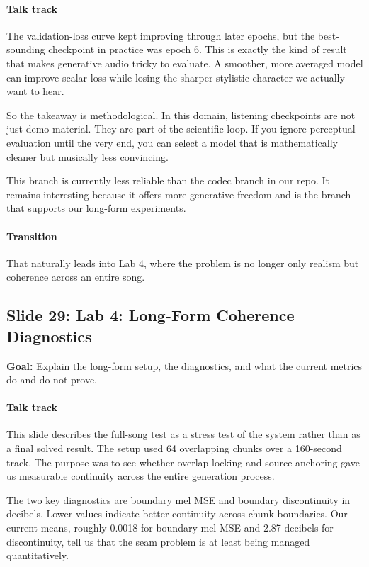 \documentclass[11pt]{article}
\begin{document}
\paragraph{Talk track}
The validation-loss curve kept improving through later epochs, but the best-sounding checkpoint in practice was epoch 6. This is exactly the kind of result that makes generative audio tricky to evaluate. A smoother, more averaged model can improve scalar loss while losing the sharper stylistic character we actually want to hear.

So the takeaway is methodological. In this domain, listening checkpoints are not just demo material. They are part of the scientific loop. If you ignore perceptual evaluation until the very end, you can select a model that is mathematically cleaner but musically less convincing.

This branch is currently less reliable than the codec branch in our repo. It remains interesting because it offers more generative freedom and is the branch that supports our long-form experiments.

\paragraph{Transition}
That naturally leads into Lab 4, where the problem is no longer only realism but coherence across an entire song.

\subsection*{Slide 29: Lab 4: Long-Form Coherence Diagnostics}
\textbf{Goal:} Explain the long-form setup, the diagnostics, and what the current metrics do and do not prove.
\paragraph{Talk track}
This slide describes the full-song test as a stress test of the system rather than as a final solved result. The setup used 64 overlapping chunks over a 160-second track. The purpose was to see whether overlap locking and source anchoring gave us measurable continuity across the entire generation process.

The two key diagnostics are boundary mel MSE and boundary discontinuity in decibels. Lower values indicate better continuity across chunk boundaries. Our current means, roughly 0.0018 for boundary mel MSE and 2.87 decibels for discontinuity, tell us that the seam problem is at least being managed quantitatively.
\end{document}
